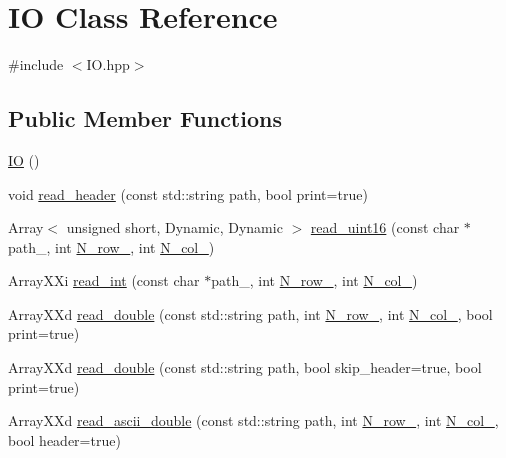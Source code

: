 \hypertarget{class_i_o}{}\section{IO Class Reference}
\label{class_i_o}


{\ttfamily \#include $<$I\+O.\+hpp$>$}

\subsection*{Public Member Functions}
\begin{DoxyCompactItemize}
\item 
\mbox{\hyperlink{class_i_o_a49b27a2ee79bce0de4e3ef163cbebd30}{IO}} ()
\item 
void \mbox{\hyperlink{class_i_o_aed76c50d1122060292bfb10181edc990}{read\+\_\+header}} (const std\+::string path, bool print=true)
\item 
Array$<$ unsigned short, Dynamic, Dynamic $>$ \mbox{\hyperlink{class_i_o_a0ba1550dc3c2b6fd4675bc03408b8d95}{read\+\_\+uint16}} (const char $\ast$path\+\_\+, int \mbox{\hyperlink{class_i_o_ab8aa1490df2e2e758766030afdae3a40}{N\+\_\+row\+\_\+}}, int \mbox{\hyperlink{class_i_o_a64aae2d2be35348233f8ddac4d6791f2}{N\+\_\+col\+\_\+}})
\item 
Array\+X\+Xi \mbox{\hyperlink{class_i_o_a7b78b5f726c5299423e72b2b44bce0c9}{read\+\_\+int}} (const char $\ast$path\+\_\+, int \mbox{\hyperlink{class_i_o_ab8aa1490df2e2e758766030afdae3a40}{N\+\_\+row\+\_\+}}, int \mbox{\hyperlink{class_i_o_a64aae2d2be35348233f8ddac4d6791f2}{N\+\_\+col\+\_\+}})
\item 
Array\+X\+Xd \mbox{\hyperlink{class_i_o_aa2d53b758b98c564688d00ca5236744e}{read\+\_\+double}} (const std\+::string path, int \mbox{\hyperlink{class_i_o_ab8aa1490df2e2e758766030afdae3a40}{N\+\_\+row\+\_\+}}, int \mbox{\hyperlink{class_i_o_a64aae2d2be35348233f8ddac4d6791f2}{N\+\_\+col\+\_\+}}, bool print=true)
\item 
Array\+X\+Xd \mbox{\hyperlink{class_i_o_a34ed8843269915cb0b4eb8719da3535d}{read\+\_\+double}} (const std\+::string path, bool skip\+\_\+header=true, bool print=true)
\item 
Array\+X\+Xd \mbox{\hyperlink{class_i_o_a3ddd4b5d95a8a5cfffb56cfcf7c186e1}{read\+\_\+ascii\+\_\+double}} (const std\+::string path, int \mbox{\hyperlink{class_i_o_ab8aa1490df2e2e758766030afdae3a40}{N\+\_\+row\+\_\+}}, int \mbox{\hyperlink{class_i_o_a64aae2d2be35348233f8ddac4d6791f2}{N\+\_\+col\+\_\+}}, bool header=true)
\item 

\end{DoxyCompactItemize}
